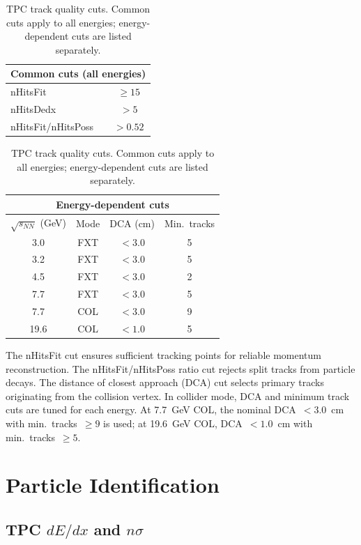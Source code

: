 \documentclass[aps,prc,preprint,superscriptaddress,nofootinbib]{revtex4-2}
\begin{document}
\begin{table}[h]
\centering
\caption{TPC track quality cuts. Common cuts apply to all energies; energy-dependent cuts are listed separately.}
\label{tab:track_cuts}
\begin{tabular}{lc}
\toprule
\multicolumn{2}{c}{\textbf{Common cuts (all energies)}} \\
\midrule
nHitsFit           & $\geq 15$ \\
nHitsDedx          & $> 5$ \\
nHitsFit/nHitsPoss & $> 0.52$ \\
\bottomrule
\end{tabular}

\vspace{0.3cm}

\begin{tabular}{cccc}
\toprule
\multicolumn{4}{c}{\textbf{Energy-dependent cuts}} \\
\midrule
$\sqrt{s_{NN}}$ (GeV) & Mode & DCA (cm) & Min.\ tracks \\
\midrule
3.0  & FXT & $< 3.0$ & 5 \\
3.2  & FXT & $< 3.0$ & 5 \\
4.5  & FXT & $< 3.0$ & 2 \\
7.7  & FXT & $< 3.0$ & 5 \\
7.7  & COL & $< 3.0$ & 9 \\
19.6 & COL & $< 1.0$ & 5 \\
\bottomrule
\end{tabular}
\end{table}

The nHitsFit cut ensures sufficient tracking points for reliable momentum reconstruction. The nHitsFit/nHitsPoss ratio cut rejects split tracks from particle decays. The distance of closest approach (DCA) cut selects primary tracks originating from the collision vertex. In collider mode, DCA and minimum track cuts are tuned for each energy. At 7.7~GeV COL, the nominal DCA~$< 3.0$~cm with min.\ tracks~$\geq 9$ is used; at 19.6~GeV COL, DCA~$< 1.0$~cm with min.\ tracks~$\geq 5$.

\section{Particle Identification}
\label{sec:pid}

\subsection{TPC $dE/dx$ and $n\sigma$}
\label{subsec:nsigma}
\end{document}
